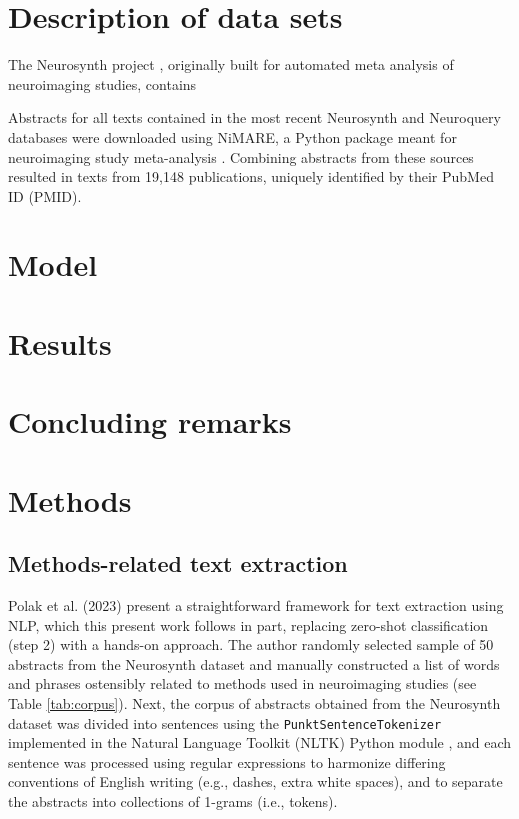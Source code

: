 \section{Description of data sets}
\label{sec:papertag.data}


The Neurosynth project \cite{YarkoniEtAl2011}, originally built for automated meta analysis of neuroimaging studies, contains 

Abstracts for all texts contained in the most recent Neurosynth and Neuroquery databases were downloaded using NiMARE, a Python package meant for neuroimaging study meta-analysis \cite{SaloEtAl2022, SaloEtAl2023}. Combining abstracts from these sources resulted in texts from 19,148 publications, uniquely identified by their PubMed ID (PMID). 

\section{Model}
\label{sec:papertag.model}


\section{Results}
\label{sec:papertag.results}


\section{Concluding remarks}
\label{sec:papertag.concludingremarks}


\section{Methods}
\label{sec:papertag.methods}

\subsection{Methods-related text extraction}

Polak et al. (2023) \cite{PolakEtAl2023} present a straightforward framework for text extraction using NLP, which this present work follows in part, replacing zero-shot classification (step 2) with a hands-on approach. The author randomly selected sample of 50 abstracts from the Neurosynth dataset and manually constructed a list of words and phrases ostensibly related to methods used in neuroimaging studies (see Table \ref{tab:corpus}). Next, the corpus of abstracts obtained from the Neurosynth dataset was divided into sentences using the \texttt{PunktSentenceTokenizer} \cite{KissStrunk2006} implemented in the Natural Language Toolkit (NLTK) Python module \cite{BirdEtAl2009}, and each sentence was processed using regular expressions to harmonize differing conventions of English writing (e.g., dashes, extra white spaces), and to separate the abstracts into collections of 1-grams (i.e., tokens). 

